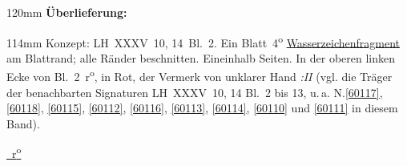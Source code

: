 
\begin{ledgroupsized}[r]{120mm}
\footnotesize
\pstart
\noindent\textbf{Überlieferung:}
\pend
\end{ledgroupsized}
\begin{ledgroupsized}[r]{114mm}
\footnotesize
\pstart \parindent -6mm
%
Konzept:
LH~XXXV~10, 14~Bl.~2. 
Ein Blatt~4\textsuperscript{o}
\href{\Scan{LH_35_10_14_002wz}}%
{Wasserzeichenfragment} am Blattrand;
alle Ränder beschnitten.
Eineinhalb Seiten.
In der oberen linken Ecke von Bl.~2~r\textsuperscript{o}, in Rot, der Vermerk von unklarer Hand \textit{:\;II}
(vgl. die Träger der benachbarten Signaturen LH~XXXV~10, 14 Bl.~2 bis 13, u.\,a. 
N.\;\ref{60117},
\ref{60118},
\ref{60115},
\ref{60112},
\ref{60116},
\ref{60113},
\ref{60114},
\ref{60110}
und \ref{60111}
in diesem Band).
\pend
\end{ledgroupsized}
\vspace{8mm}
\pstart
\centering
\href{\Scan{LH_35_10_14_002r}}%
{~r\textsuperscript{o}\rbrack}
\hfill
{}
\pend
\vspace{0.5\baselineskip}
\pstart
\noindent 
